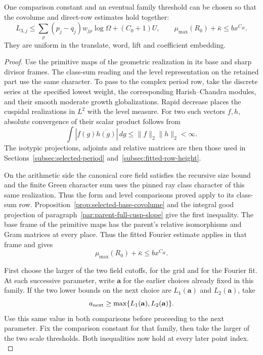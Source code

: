 \begin{lemma}
One comparison constant and an eventual family threshold can be
chosen so that the covolume and direct-row estimates hold together:
\[
 L_{3,j}\le\sum_\rho(p_j-q_j)w_{j\rho}\log\Omega+(C_0+1)U,\qquad
 \mu_{\max}(R_0)+\bar\kappa\le b x^{C_H}.
\]
They are uniform in the translate, word, lift and coefficient embedding.
\end{lemma}
\begin{proof}
Use the primitive maps of the geometric realization in its base
and sharp divisor frames. The class-sum reading and the level
representation on the retained part use the same character. To pass to the complex period row,
take the discrete series at the specified lowest weight, the
corresponding Harish--Chandra modules, and their smooth moderate
growth globalizations. Rapid decrease places the cuspidal realizations in \(L^2\) with the level measure. For two such vectors \(f,h\), absolute convergence of their scalar product follows from
\[
  \int |f(g)\overline{h(g)}|\,dg\le\|f\|_2\|h\|_2<\infty.
\]
The isotypic projections, adjoints and relative matrices are then
those used in Sections~\ref{subsec:selected-period}
and~\ref{subsec:fitted-row-height}.

On the arithmetic side the
canonical core field satisfies the recursive size bound and the
finite Green character sum uses the pinned ray class character
of this same realization. Thus the form and level comparisons
proved apply to its class-sum row. Proposition~\ref{prop:selected-base-covolume}
and the integral good projection of paragraph~\ref{par:parent-full-cusp-slope}
give the first inequality. The base frame of the primitive maps has the parent's relative isomorphisms and Gram matrices at every place. Thus the fitted Fourier estimate applies in that frame and gives
\[
  \mu_{\max}(R_0)+\bar\kappa\le b x^{C_H}.
\]
\label{cor:word-division-4}

First choose the larger of the two field cutoffs, for the grid
and for the Fourier fit. At each successive parameter, write \(\mathbf a\) for the earlier choices already fixed in this family. If the two lower bounds on the next choice are \(L_1(\mathbf a)\) and \(L_2(\mathbf a)\), take
\[
  a_{\rm next}\ge\max\{L_1(\mathbf a),L_2(\mathbf a)\}.
\]
Use this same value in both comparisons before proceeding to the next parameter. Fix the comparison constant for that family, then take
the larger of the two scale thresholds. Both inequalities now
hold at every later point index. \label{cor:word-division-5}
\end{proof}

